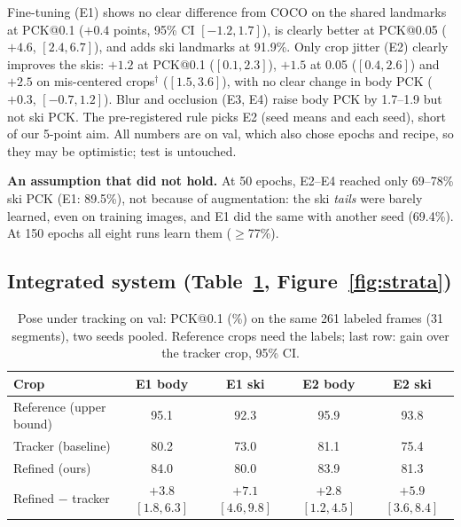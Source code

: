 \documentclass{article}
\begin{document}
Fine-tuning (E1) shows no clear difference from
COCO on the shared landmarks at PCK@0.1 ($+0.4$ points, 95\% CI $[-1.2, 1.7]$), is clearly better at PCK@0.05
($+4.6$, $[2.4, 6.7]$), and adds ski landmarks at 91.9\%. Only crop jitter (E2) clearly improves the skis: $+1.2$ at
PCK@0.1 ($[0.1, 2.3]$), $+1.5$ at 0.05 ($[0.4, 2.6]$) and $+2.5$ on mis-centered crops$^{\dagger}$ ($[1.5, 3.6]$),
with no clear change in body PCK ($+0.3$, $[-0.7, 1.2]$). Blur and occlusion (E3, E4) raise body PCK by 1.7--1.9
but not ski PCK. The pre-registered rule picks E2 (seed means and each seed), short of our 5-point aim. All numbers
are on val, which also chose epochs and recipe, so they may be optimistic; test is untouched.

\textbf{An assumption that did not hold.} At 50 epochs, E2--E4 reached only 69--78\% ski PCK (E1: 89.5\%), not
because of augmentation: the ski \emph{tails} were barely learned, even on training images, and E1 did the same with
another seed (69.4\%). At 150 epochs all eight runs learn them ($\geq$77\%).

\subsection{Integrated system (Table~\ref{tab:system}, Figure~\ref{fig:strata})}

\begin{table}[h]
  \centering
  \small
  \setlength{\tabcolsep}{4pt}
  \begin{tabular}{lcccc}
    \toprule
    Crop & E1 body & E1 ski & E2 body & E2 ski \\
    \midrule
    Reference (upper bound) & 95.1 & 92.3 & 95.9 & 93.8 \\
    Tracker (baseline) & 80.2 & 73.0 & 81.1 & 75.4 \\
    Refined (ours) & 84.0 & 80.0 & 83.9 & 81.3 \\
    \midrule
    Refined $-$ tracker & $+3.8$ $[1.8, 6.3]$ & $+7.1$ $[4.6, 9.8]$ & $+2.8$ $[1.2, 4.5]$ & $+5.9$ $[3.6, 8.4]$ \\
    \bottomrule
  \end{tabular}
  \caption{Pose under tracking on val: PCK@0.1 (\%) on the same 261 labeled frames (31 segments), two seeds pooled.
  Reference crops need the labels; last row: gain over the tracker crop, 95\% CI.}
  \label{tab:system}
\end{table}
\end{document}
